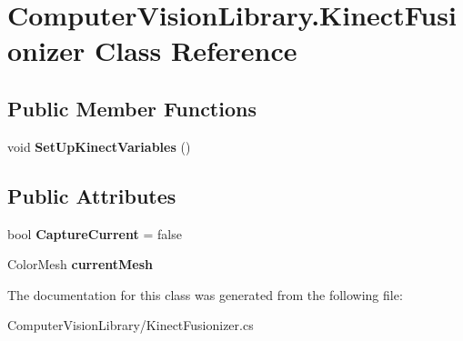 \hypertarget{class_computer_vision_library_1_1_kinect_fusionizer}{}\section{Computer\+Vision\+Library.\+Kinect\+Fusionizer Class Reference}
\label{class_computer_vision_library_1_1_kinect_fusionizer}
\subsection*{Public Member Functions}
\begin{DoxyCompactItemize}
\item 
\hypertarget{class_computer_vision_library_1_1_kinect_fusionizer_ad8ec6c5135c56d77d307b59f76d40634}{}\label{class_computer_vision_library_1_1_kinect_fusionizer_ad8ec6c5135c56d77d307b59f76d40634} 
void {\bfseries Set\+Up\+Kinect\+Variables} ()
\end{DoxyCompactItemize}
\subsection*{Public Attributes}
\begin{DoxyCompactItemize}
\item 
\hypertarget{class_computer_vision_library_1_1_kinect_fusionizer_aab0db833b58f1c6f022dcc4a96727621}{}\label{class_computer_vision_library_1_1_kinect_fusionizer_aab0db833b58f1c6f022dcc4a96727621} 
bool {\bfseries Capture\+Current} = false
\item 
\hypertarget{class_computer_vision_library_1_1_kinect_fusionizer_ab7be698214e5029de3ef03a43d492270}{}\label{class_computer_vision_library_1_1_kinect_fusionizer_ab7be698214e5029de3ef03a43d492270} 
Color\+Mesh {\bfseries current\+Mesh}
\end{DoxyCompactItemize}


The documentation for this class was generated from the following file\+:\begin{DoxyCompactItemize}
\item 
Computer\+Vision\+Library/Kinect\+Fusionizer.\+cs\end{DoxyCompactItemize}
